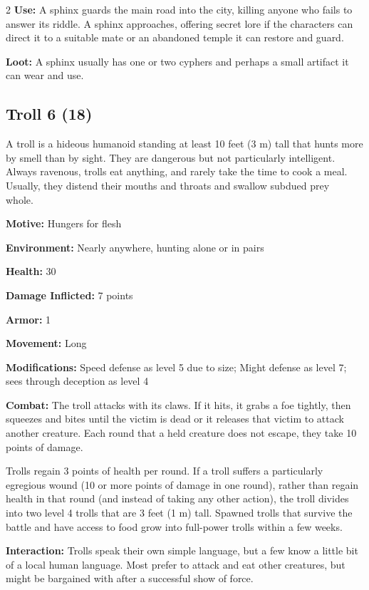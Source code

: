 \begin{multicols}{2}
\textbf{Use:} A sphinx guards the main road into the city, killing anyone who fails to answer its riddle. A sphinx approaches, offering secret lore if the characters can direct it to a suitable mate or an abandoned temple it can restore and guard. 

\textbf{Loot:} A sphinx usually has one or two cyphers and perhaps a small artifact it can wear and use.

\subsection{Troll 6 (18)}

A troll is a hideous humanoid standing at least 10 feet (3 m) tall that hunts more by smell than by sight. They are dangerous but not particularly intelligent. Always ravenous, trolls eat anything, and rarely take the time to cook a meal. Usually, they distend their mouths and throats and swallow subdued prey whole. 

\textbf{Motive:} Hungers for flesh 

\textbf{Environment:} Nearly anywhere, hunting alone or in pairs 

\textbf{Health:} 30 

\textbf{Damage Inflicted:} 7 points 

\textbf{Armor:} 1 

\textbf{Movement:} Long 

\textbf{Modifications:} Speed defense as level 5 due to size; Might defense as level 7; sees through deception as level 4 

\textbf{Combat:} The troll attacks with its claws. If it hits, it grabs a foe tightly, then squeezes and bites until the victim is dead or it releases that victim to attack another creature. Each round that a held creature does not escape, they take 10 points of damage. 

Trolls regain 3 points of health per round. If a troll suffers a particularly egregious wound (10 or more points of damage in one round), rather than regain health in that round (and instead of taking any other action), the troll divides into two level 4 trolls that are 3 feet (1 m) tall. Spawned trolls that survive the battle and have access to food grow into full-power trolls within a few weeks. 

\textbf{Interaction:} Trolls speak their own simple language, but a few know a little bit of a local human language. Most prefer to attack and eat other creatures, but might be bargained with after a successful show of force. 


\end{multicols}
